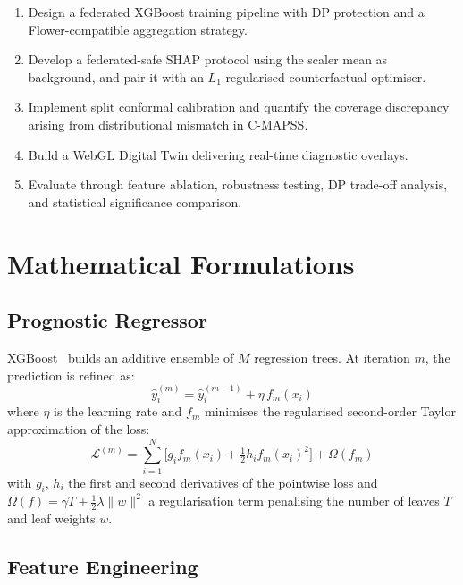 \documentclass[10pt, journal, letterpaper]{IEEEtran}
\begin{document}
\begin{enumerate}
  \item Design a federated XGBoost training pipeline with DP protection and
  a Flower-compatible aggregation strategy.
  \item Develop a federated-safe SHAP protocol using the scaler mean as
  background, and pair it with an $L_1$-regularised counterfactual optimiser.
  \item Implement split conformal calibration and quantify the coverage
  discrepancy arising from distributional mismatch in C-MAPSS.
  \item Build a WebGL Digital Twin delivering real-time diagnostic overlays.
  \item Evaluate through feature ablation, robustness testing, DP trade-off
  analysis, and statistical significance comparison.
\end{enumerate}

\section{Mathematical Formulations}
\label{sec:methodology}

\subsection{Prognostic Regressor}

XGBoost~\cite{chen2016xgboost} builds an additive ensemble of $M$ regression
trees. At iteration $m$, the prediction is refined as:
\begin{equation}
  \hat{y}_i^{(m)} = \hat{y}_i^{(m-1)} + \eta\, f_m(x_i)
  \label{eq:xgb_update}
\end{equation}
where $\eta$ is the learning rate and $f_m$ minimises the regularised
second-order Taylor approximation of the loss:
\begin{equation}
  \mathcal{L}^{(m)} = \!\sum_{i=1}^{N}\!
    \bigl[g_i f_m(x_i) + \tfrac{1}{2} h_i f_m(x_i)^2\bigr] + \Omega(f_m)
\end{equation}
with $g_i$, $h_i$ the first and second derivatives of the pointwise loss and
$\Omega(f) = \gamma T + \frac{1}{2}\lambda\|w\|^2$ a regularisation term
penalising the number of leaves $T$ and leaf weights $w$.

\subsection{Feature Engineering}
\end{document}
